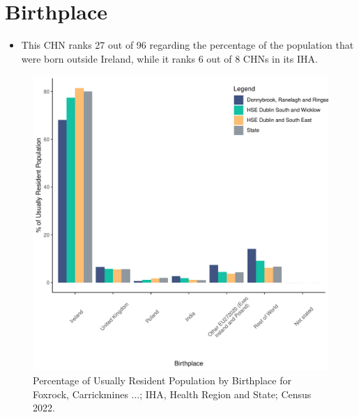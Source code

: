 \documentclass{article}
\begin{document}
\section{Birthplace}\label{sect:Birth}
\begin{itemize}
\item This CHN ranks  27 out of 96 regarding the percentage of the population that were born outside Ireland, while it ranks  6 out of 8 CHNs in its IHA.
\end{itemize}
\begin{figure}[H]
	\centering
	\includegraphics[width = 130mm]{../figures/BirthED.pdf}
	\caption{Percentage of Usually Resident Population by Birthplace for Foxrock, Carrickmines ...; IHA, Health Region and State; Census 2022.}
	\label{fig:vbnv}
	\end{figure}
	
\end{document}
